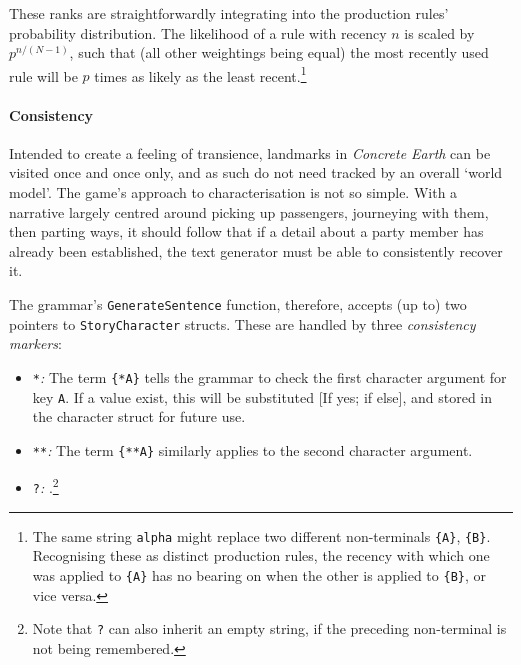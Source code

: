 \documentclass[a4paper, 11pt]{article}
\begin{document}
\begin{flushleft}
\vspace{5pt}\noindent
These ranks are straightforwardly integrating into the production rules' probability distribution. The likelihood of a rule with recency $n$ is scaled by $p^{n/(N-1)}$, such that (all other weightings being equal) the most recently used rule will be $p$ times as likely as the least recent.\footnote{The same string \texttt{alpha} might replace two different non-terminals \texttt{\{A\}}, \texttt{\{B\}}. Recognising these as distinct production rules, the recency with which one was applied to \texttt{\{A\}} has no bearing on when the other is applied to \texttt{\{B\}}, or vice versa.} 


\paragraph{Consistency} Intended to create a feeling of transience, landmarks in \textit{Concrete Earth} can be visited once and once only, and as such do not need tracked by an overall `world model'. The game's approach to characterisation is not so simple. With a narrative largely centred around picking up passengers, journeying with them, then parting ways, it should follow that if a detail about a party member has already been established, the text generator must be able to consistently recover it. %

\vspace{5pt}\noindent
The grammar's \texttt{GenerateSentence} function, therefore, accepts (up to) two pointers to \texttt{StoryCharacter} structs. These are handled by three \textit{consistency markers}: %
\begin{itemize}[noitemsep]
\item \verb|*|\textit{:} The term \verb|{*A}| tells the grammar to check the first character argument for key \verb|A|. If a value exist, this will be substituted  [If yes; if else], and stored in the character struct for future use.
\item \verb|**|\textit{:} The term \verb|{**A}| similarly applies to the second character argument.
\item \verb|?|\textit{:} %
.\footnote{Note that \texttt{?} can also inherit an empty string, if the preceding non-terminal is not being remembered.}
\end{itemize}




\end{flushleft}
\end{document}
